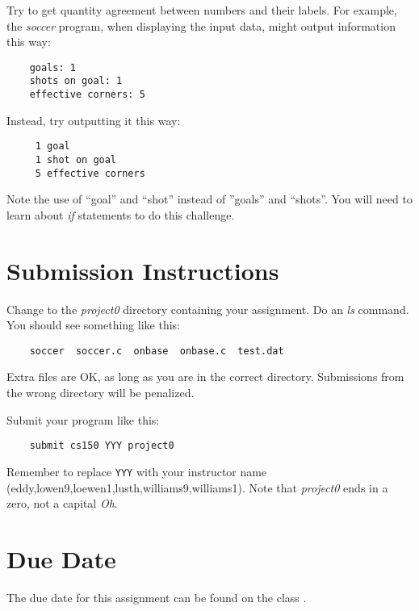 \documentclass[12pt]{article}
\begin{document}
Try to get quantity agreement between numbers and their labels. For
example, the {\it soccer} program, when displaying the input data,
might output information this way:

\begin{verbatim}
    goals: 1
    shots on goal: 1
    effective corners: 5
\end{verbatim}

Instead, try outputting it this way:

\begin{verbatim}
     1 goal
     1 shot on goal
     5 effective corners
\end{verbatim}

Note the use of ``goal'' and ``shot'' instead of ''goals'' and 
``shots''.
You will need to learn about {\it if} statements to do this challenge.

\section*{Submission Instructions}

Change to the {\it project0} directory containing your assignment.  Do an
{\it ls} command. You should see something like this:

\begin{verbatim}
    soccer  soccer.c  onbase  onbase.c  test.dat
\end{verbatim}

Extra files are OK, as long as you are in the correct directory. 
Submissions from the wrong directory
will be penalized.

Submit your program like this:

\begin{verbatim}
    submit cs150 YYY project0
\end{verbatim}

Remember to replace \verb!YYY! with your instructor name
(eddy,lowen9,loewen1,lusth,williams9,williams1).
Note that {\it project0} ends in a zero, not a capital {\it Oh}.

\section*{Due Date}

The due date for this assignment can be found on the class
.
\end{document}
